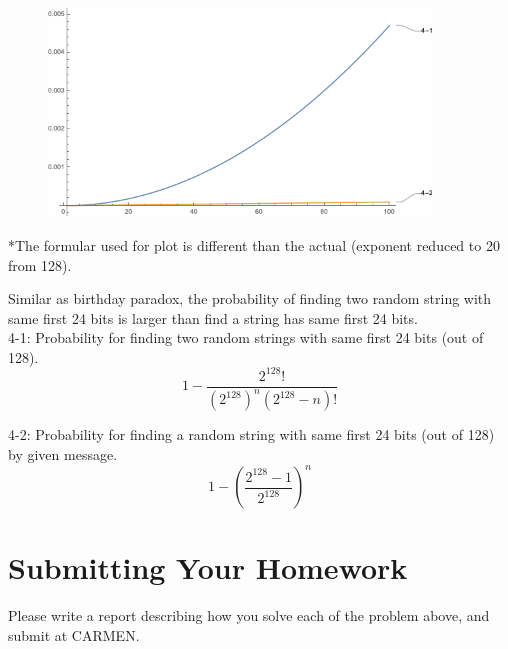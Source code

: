 \documentclass[11pt]{article}
\begin{document}
\begin{enumerate}
\begin{figure}[h!]
  \includegraphics[width=4in]{source/4-4.png}
  \centering
\end{figure}
\small{*The formular used for plot is different than the actual (exponent reduced to 20 from 128).}

Similar as birthday paradox, the probability of finding two random string with same first 24 bits is larger than find a string has same first 24 bits. \\

4-1: Probability for finding two random strings with same first 24 bits (out of 128).
$$1-\frac{2^{128}!}{\left(2^{128}\right)^{n} \left(2^{128}-n\right)!}$$

4-2: Probability for finding a random string with same first 24 bits (out of 128) by given message.
$$1-\left(\frac{2^{128}-1}{2^{128}}\right)^{n}$$
\end{enumerate}

\section{Submitting Your Homework}
Please write a report describing how you solve each of the problem above, and submit at CARMEN.
\end{document}
